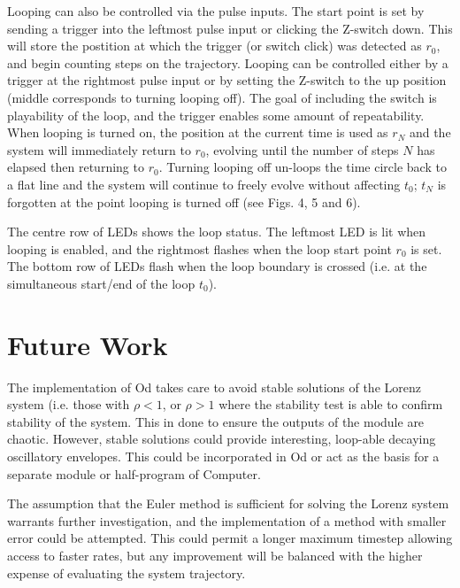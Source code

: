 \documentclass{tufte-handout}
\begin{document}
Looping can also be controlled via the pulse inputs. The start point is set by sending a trigger into the leftmost pulse input or clicking the Z-switch down. This will store the postition at which the trigger (or switch click) was detected as $r_0$, and begin counting steps on the trajectory. Looping can be controlled either by a trigger at the rightmost pulse input or by setting the Z-switch to the up position (middle corresponds to turning looping off). The goal of including the switch is playability of the loop, and the trigger enables some amount of repeatability. When looping is turned on, the position at the current time is used as $r_N$ and the system will immediately return to $r_0$, evolving until the number of steps $N$ has elapsed then returning to $r_0$. Turning looping off un-loops the time circle back to a flat line and the system will continue to freely evolve without affecting $t_0$; $t_N$ is forgotten at the point looping is turned off (see Figs. 4, 5 and 6).

The centre row of LEDs shows the loop status. The leftmost LED is lit when looping is enabled, and the rightmost flashes when the loop start point $r_0$ is set. The bottom row of LEDs flash when the loop boundary is crossed (i.e. at the simultaneous start/end of the loop $t_0$).


\section{Future Work}\label{sec:future_work}

The implementation of Od takes care to avoid stable solutions of the Lorenz system (i.e. those with $\rho < 1$, or $\rho > 1$ where the stability test is able to confirm stability of the system. This in done to ensure the outputs of the module are chaotic. However, stable solutions could provide interesting, loop-able decaying oscillatory envelopes. This could be incorporated in Od or act as the basis for a separate module or half-program of Computer.

The assumption that the Euler method is sufficient for solving the Lorenz system warrants further investigation, and the implementation of a method with smaller error could be attempted. This could permit a longer maximum timestep allowing access to faster rates, but any improvement will be balanced with the higher expense of evaluating the system trajectory.




\end{document}
